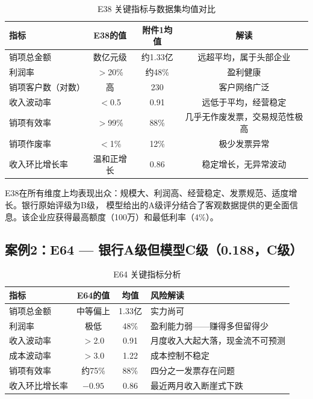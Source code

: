 \documentclass[12pt,a4paper]{ctexart}
\begin{document}
\begin{table}[H]
\centering
\caption{E38 关键指标与数据集均值对比}
\label{tab:case1}
\begin{tabular}{l|c|c|c}
\toprule
\textbf{指标} & \textbf{E38的值} & \textbf{附件1均值} & \textbf{解读} \\
\midrule
销项总金额 & 数亿元级 & 约1.33亿 & 远超平均，属于头部企业 \\
利润率 & $>$20\% & 约48\% & 盈利健康 \\
销项客户数（对数） & 高 & 230 & 客户网络广泛 \\
收入波动率 & $<$0.5 & 0.91 & 远低于平均，经营稳定 \\
销项有效率 & $>$99\% & 88\% & 几乎无作废发票，交易规范性极高 \\
销项作废率 & $<$1\% & 12\% & 极少发票异常 \\
收入环比增长率 & 温和正增长 & 0.86 & 稳定增长，无异常波动 \\
\bottomrule
\end{tabular}
\end{table}

E38在所有维度上均表现出众：规模大、利润高、经营稳定、发票规范、适度增长。银行原始评级为B级，
模型给出的A级评分结合了客观数据提供的更全面信息。该企业应获得最高额度（100万）和最低利率（4\%）。

\subsection{案例2：E64 — 银行A级但模型C级（0.188，C级）}

\begin{table}[H]
\centering
\caption{E64 关键指标分析}
\label{tab:case2}
\begin{tabular}{l|c|c|l}
\toprule
\textbf{指标} & \textbf{E64的值} & \textbf{均值} & \textbf{风险解读} \\
\midrule
销项总金额 & 中等偏上 & 1.33亿 & 实力尚可 \\
利润率 & 极低 & 48\% & 盈利能力弱——赚得多但留得少 \\
收入波动率 & $>$2.0 & 0.91 & 月度收入大起大落，现金流不可预测 \\
成本波动率 & $>$3.0 & 1.22 & 成本控制不稳定 \\
销项有效率 & 约75\% & 88\% & 四分之一发票存在问题 \\
收入环比增长率 & $-0.95$ & 0.86 & 最近两月收入断崖式下跌 \\
\bottomrule
\end{tabular}
\end{table}
\end{document}
